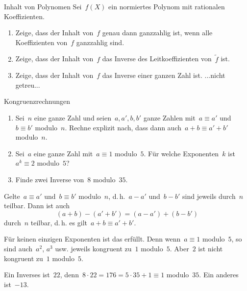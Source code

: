\documentclass{algblatt}
\begin{document}
\begin{aufgabe}{Inhalt von Polynomen}
Sei~$f(X)$ ein normiertes Polynom mit rationalen Koeffizienten.
\begin{enumerate}
\item Zeige, dass der Inhalt von~$f$ genau dann ganzzahlig ist, wenn alle
Koeffizienten von~$f$ ganzzahlig sind.
\item Zeige, dass der Inhalt von~$f$ das Inverse des Leitkoeffizienten
von~$\widetilde f$ ist.
\item Zeige, dass der Inhalt von~$f$ das Inverse einer ganzen Zahl ist.
...nicht getreu...
\end{enumerate}

\begin{loesungE}
\end{loesungE}
\end{aufgabe}

\begin{aufgabe}{Kongruenzrechnungen}
\begin{enumerate}
\item Sei~$n$ eine ganze Zahl und seien~$a,a', b,b'$ ganze Zahlen mit~$a \equiv
a'$ und~$b \equiv b'$ modulo~$n$. Rechne explizit nach, dass dann auch~$a+b
\equiv a'+b'$ modulo~$n$.
\item Sei~$a$ eine ganze Zahl mit~$a \equiv 1$ modulo~$5$. Für welche
Exponenten~$k$ ist~$a^k \equiv 2$ modulo~$5$?
\item Finde zwei Inverse von~$8$ modulo~$35$.
\end{enumerate}

\begin{loesungE}
\item Gelte~$a \equiv a'$ und~$b \equiv b'$ modulo~$n$, d.\,h.~$a - a'$ und~$b
- b'$ sind jeweils durch~$n$ teilbar. Dann ist auch
\[ (a+b) - (a'+b') = (a-a') + (b-b') \]
durch~$n$ teilbar, d.\,h. es gilt~$a+b \equiv a'+b'$.

\item Für keinen einzigen Exponenten ist das erfüllt. Denn wenn~$a \equiv 1$
modulo~$5$, so sind auch~$a^2$, $a^3$ usw. jeweils kongruent zu~$1$ modulo~$5$.
Aber~$2$ ist nicht kongruent zu~$1$ modulo~$5$.

\item Ein Inverses ist~$22$, denn~$8 \cdot 22 = 176 = 5 \cdot 35 + 1 \equiv 1$
modulo~$35$. Ein anderes ist~$-13$.
\end{loesungE}
\end{aufgabe}
\end{document}
